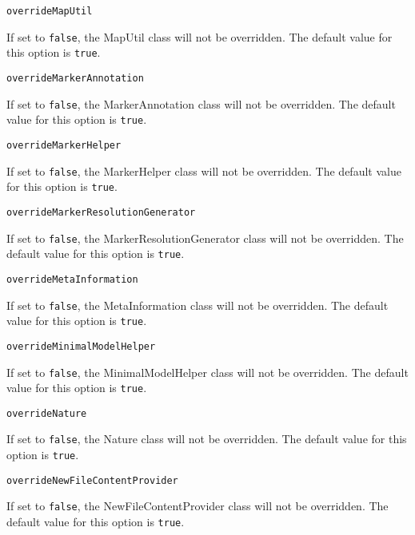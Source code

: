 \noindent\texttt{overrideMapUtil}
\begin{myindentpar}{1cm}
If set to \texttt{false}, the MapUtil class will not be overridden. The default value for this option is \texttt{true}.
\end{myindentpar}

\noindent\texttt{overrideMarkerAnnotation}
\begin{myindentpar}{1cm}
If set to \texttt{false}, the MarkerAnnotation class will not be overridden. The default value for this option is \texttt{true}.
\end{myindentpar}

\noindent\texttt{overrideMarkerHelper}
\begin{myindentpar}{1cm}
If set to \texttt{false}, the MarkerHelper class will not be overridden. The default value for this option is \texttt{true}.
\end{myindentpar}

\noindent\texttt{overrideMarkerResolutionGenerator}
\begin{myindentpar}{1cm}
If set to \texttt{false}, the MarkerResolutionGenerator class will not be overridden. The default value for this option is \texttt{true}.
\end{myindentpar}

\noindent\texttt{overrideMetaInformation}
\begin{myindentpar}{1cm}
If set to \texttt{false}, the MetaInformation class will not be overridden. The default value for this option is \texttt{true}.
\end{myindentpar}

\noindent\texttt{overrideMinimalModelHelper}
\begin{myindentpar}{1cm}
If set to \texttt{false}, the MinimalModelHelper class will not be overridden. The default value for this option is \texttt{true}.
\end{myindentpar}

\noindent\texttt{overrideNature}
\begin{myindentpar}{1cm}
If set to \texttt{false}, the Nature class will not be overridden. The default value for this option is \texttt{true}.
\end{myindentpar}

\noindent\texttt{overrideNewFileContentProvider}
\begin{myindentpar}{1cm}
If set to \texttt{false}, the NewFileContentProvider class will not be overridden. The default value for this option is \texttt{true}.
\end{myindentpar}

